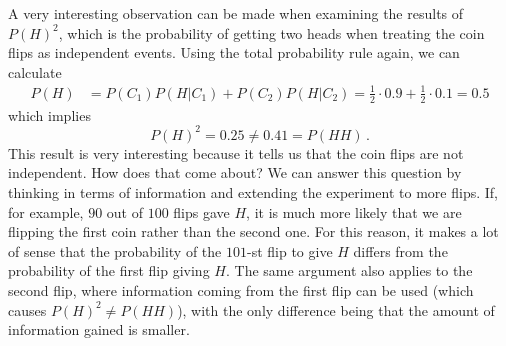 \begin{ex}
A very interesting observation can be made when examining the results of $P(H)^2$, which is the probability of getting two heads when treating the coin flips as independent events. Using the total probability rule again, we can calculate
\begin{align*}
P(H) &= P(C_1) P(H | C_1) + P(C_2) P(H | C_2) = \frac{1}{2} \cdot 0.9 + \frac{1}{2} \cdot 0.1 = 0.5
\end{align*}
which implies
\begin{equation*}
P(H)^2 = 0.25 \neq 0.41 = P(HH) \, .
\end{equation*}
This result is very interesting because it tells us that the coin flips are not independent. How does that come about? We can answer this question by thinking in terms of information and extending the experiment to more flips. If, for example, $90$ out of $100$ flips gave $H$, it is much more likely that we are flipping the first coin rather than the second one. 
For this reason, it makes a lot of sense that the probability of the $101$-st flip to give $H$ differs from the probability of the first flip giving $H$. The same argument also applies to the second flip, where information coming from the first flip can be used (which causes $P(H)^2 \neq P(HH)$), with the only difference being that the amount of information gained is smaller.


\end{ex}
